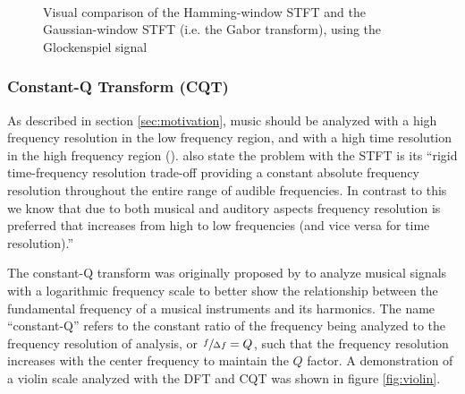 \documentclass[report.tex]{subfiles}
\begin{document}
\begin{figure}[ht]
	\\
	\caption{Visual comparison of the Hamming-window STFT and the Gaussian-window STFT (i.e. the Gabor transform), using the Glockenspiel signal}
	\label{fig:stfts}
\end{figure}

\newpagefill

\subsubsection{Constant-Q Transform (CQT)}

As described in section \ref{sec:motivation}, music should be analyzed with a high frequency resolution in the low frequency region, and with a high time resolution in the high frequency region (\cite{doerflerphd, cqtransient}). \textcite{cqtransient} also state the problem with the STFT is its ``rigid time-frequency resolution trade-off providing a constant absolute frequency resolution throughout the entire range of audible frequencies. In contrast to this we know that due to both musical and auditory aspects frequency resolution is preferred that increases from high to low frequencies (and vice versa for time resolution).''

The constant-Q transform was originally proposed by \textcite{jbrown} to analyze musical signals with a logarithmic frequency scale to better show the relationship between the fundamental frequency of a musical instruments and its harmonics. The name ``constant-Q'' refers to the constant ratio of the frequency being analyzed to the frequency resolution of analysis, or $\sfrac{f}{\Delta f} = Q$, such that the frequency resolution increases with the center frequency to maintain the $Q$ factor. A demonstration of a violin scale analyzed with the DFT and CQT was shown in figure \ref{fig:violin}.
\end{document}
